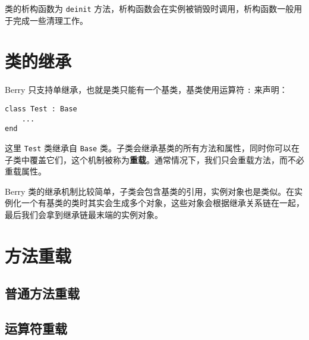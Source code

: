 类的析构函数为 \texttt{deinit} 方法，析构函数会在实例被销毁时调用，析构函数一般用于完成一些清理工作。

\section{类的继承}

Berry 只支持单继承，也就是类只能有一个基类，基类使用运算符 \texttt{:} 来声明：
\begin{lstlisting}[language=berry, numbers=none]
class Test : Base
    ...
end
\end{lstlisting}
这里 \texttt{Test} 类继承自 \texttt{Base} 类。子类会继承基类的所有方法和属性，同时你可以在子类中覆盖它们，这个机制被称为\textbf{重载}。通常情况下，我们只会重载方法，而不必重载属性。

Berry 类的继承机制比较简单，子类会包含基类的引用，实例对象也是类似。在实例化一个有基类的类时其实会生成多个对象，这些对象会根据继承关系链在一起，最后我们会拿到继承链最末端的实例对象。

\section{方法重载}

\subsection{普通方法重载}

\subsection{运算符重载}
